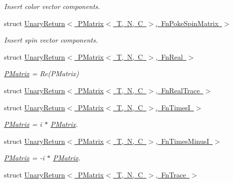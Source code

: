 \begin{DoxyCompactItemize}
\begin{DoxyCompactList}\small\item\em Insert color vector components. \end{DoxyCompactList}\item 
struct \mbox{\hyperlink{structENSEM_1_1UnaryReturn_3_01PMatrix_3_01T_00_01N_00_01C_01_4_00_01FnPokeSpinMatrix_01_4}{Unary\+Return$<$ P\+Matrix$<$ T, N, C $>$, Fn\+Poke\+Spin\+Matrix $>$}}
\begin{DoxyCompactList}\small\item\em Insert spin vector components. \end{DoxyCompactList}\item 
struct \mbox{\hyperlink{structENSEM_1_1UnaryReturn_3_01PMatrix_3_01T_00_01N_00_01C_01_4_00_01FnReal_01_4}{Unary\+Return$<$ P\+Matrix$<$ T, N, C $>$, Fn\+Real $>$}}
\begin{DoxyCompactList}\small\item\em \mbox{\hyperlink{classENSEM_1_1PMatrix}{P\+Matrix}} = Re(\+P\+Matrix) \end{DoxyCompactList}\item 
struct \mbox{\hyperlink{structENSEM_1_1UnaryReturn_3_01PMatrix_3_01T_00_01N_00_01C_01_4_00_01FnRealTrace_01_4}{Unary\+Return$<$ P\+Matrix$<$ T, N, C $>$, Fn\+Real\+Trace $>$}}
\item 
struct \mbox{\hyperlink{structENSEM_1_1UnaryReturn_3_01PMatrix_3_01T_00_01N_00_01C_01_4_00_01FnTimesI_01_4}{Unary\+Return$<$ P\+Matrix$<$ T, N, C $>$, Fn\+Times\+I $>$}}
\begin{DoxyCompactList}\small\item\em \mbox{\hyperlink{classENSEM_1_1PMatrix}{P\+Matrix}} = i $\ast$ \mbox{\hyperlink{classENSEM_1_1PMatrix}{P\+Matrix}}. \end{DoxyCompactList}\item 
struct \mbox{\hyperlink{structENSEM_1_1UnaryReturn_3_01PMatrix_3_01T_00_01N_00_01C_01_4_00_01FnTimesMinusI_01_4}{Unary\+Return$<$ P\+Matrix$<$ T, N, C $>$, Fn\+Times\+Minus\+I $>$}}
\begin{DoxyCompactList}\small\item\em \mbox{\hyperlink{classENSEM_1_1PMatrix}{P\+Matrix}} = -\/i $\ast$ \mbox{\hyperlink{classENSEM_1_1PMatrix}{P\+Matrix}}. \end{DoxyCompactList}\item 
struct \mbox{\hyperlink{structENSEM_1_1UnaryReturn_3_01PMatrix_3_01T_00_01N_00_01C_01_4_00_01FnTrace_01_4}{Unary\+Return$<$ P\+Matrix$<$ T, N, C $>$, Fn\+Trace $>$}}
\item 

\end{DoxyCompactItemize}
